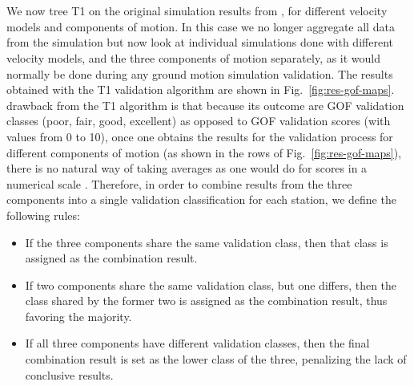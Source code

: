 
\section{}

We now  tree T1 on the original simulation results from \citet{Taborda_2014_BSSA}, for different velocity models and components of motion. In this case we no longer aggregate all data from the simulation but now look at individual simulations done with different velocity models, and the three components of motion separately, as it would normally be done during any ground motion simulation validation. The results obtained with the T1 validation algorithm are shown in Fig.~\ref{fig:res-gof-maps}. 
%
%
%
drawback from the T1 algorithm is that because its outcome are GOF validation classes (poor, fair, good, excellent) as opposed to GOF validation scores (with values from 0 to 10), once one obtains the results for the validation process for different components of motion (as shown in the rows of Fig.~\ref{fig:res-gof-maps}), there is no natural way of taking averages as one would do for scores in a numerical scale . Therefore, in order to combine results from the three components into a single validation classification for each station, we define the following rules:

\begin{itemize}
	\setlength\itemsep{0ex}
	\item If the three components share the same validation class, then that class is assigned as the combination result.
	\item If two components share the same validation class, but one differs, then the class shared by the former two is assigned as the combination result, thus favoring the majority.
	\item If all three components have different validation classes, then the final combination result is set as the lower class of the three, penalizing the lack of conclusive results.
\end{itemize}

